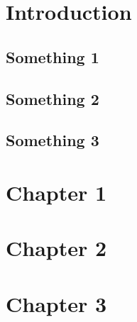 \documentclass[a4paper,12pt,oneside]{article}
\numberwithin{equation}{section}
\begin{document}






\newpage
\pagestyle{fancy}
\tableofcontents
\thispagestyle{fancy}
\vspace{2cm}


\newpage



\clearpage
\newpage





\section{Introduction}

\subsection{Something 1}
\subsection{Something 2}
\subsection{Something 3}

\section{Chapter 1}

\section{Chapter 2}

\section{Chapter 3}

\newpage



\end{document}
